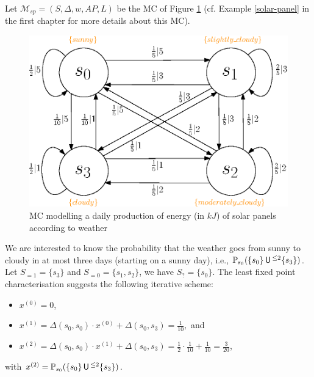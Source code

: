\begin{example}
Let $\mathcal{M}_{sp} = (S, \Delta, w, AP, L)$ be the MC of Figure \ref{solarpanel} (cf. Example \ref{solar-panel} in the first chapter for more details about this MC).
  \begin{figure}[h!]
    \centering
    \includegraphics[width=0.5\linewidth]{resources/weather-solar-pannel}
    \captionsetup{justification=centering}
    \caption{MC modelling a daily production of energy (in $kJ$) of solar panels according to weather}
    \label{solarpanel}
  \end{figure}
  We are interested to know the probability that the weather goes from sunny to cloudy in at most three days
  (starting on a sunny day), i.e., $\mathbb{P}_{s_0}(\{s_0\} \,\text{\sffamily U}\,^{\leq 2} \{s_3\})$.
  Let $S_{=1} = \{s_3\}$ and $S_{=0} = \{ s_1, s_2 \}$, we have $S_? = \{s_0\}$. The least fixed point characterisation suggests the following iterative scheme:
  \begin{itemize}
    \item $x^{(0)} = 0$,
    \item $x^{(1)} = \Delta(s_0, s_0) \cdot x^{(0)} + \Delta(s_0, s_3) = \frac{1}{10},$ and
    \item $x^{(2)} = \Delta(s_0, s_0) \cdot x^{(1)} + \Delta(s_0, s_3) = \frac{1}{2} \cdot \frac{1}{10} + \frac{1}{10} = \frac{3}{20}$,
  \end{itemize}
  with $x^{(2)} = \mathbb{P}_{s_0}(\{s_0\} \,\text{\sffamily U}\,^{\leq 2} \{s_3\})$.
\end{example}
